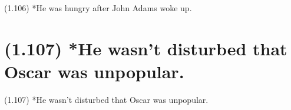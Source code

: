 \documentclass{article}
\begin{document}
\bigbreak
\begin{enumerate*}
\item[(1.106)] *He was hungry after John Adams woke up.
\end{enumerate*}
\bigbreak

\bigbreak
\begin{minipage}{\textwidth}
\end{minipage}
\bigbreak

\clearpage

%
%

\section*{(1.107) *He wasn't disturbed that Oscar was unpopular.}

\bigbreak
\begin{enumerate*}
\item[(1.107)] *He wasn't disturbed that Oscar was unpopular.
\end{enumerate*}
\bigbreak
\end{document}
